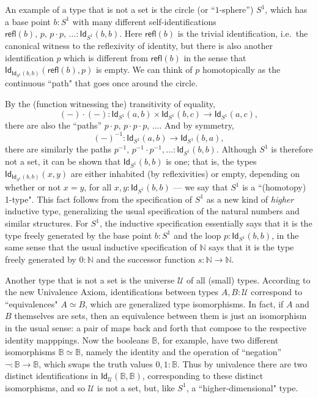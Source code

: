 \documentclass[11pt]{article}
\newcommand{\B}{\ensuremath{\mathbb{B}}}
\newcommand{\N}{\ensuremath{\mathbb{N}}}
\newcommand{\Id}{\mathsf{Id}}
\newcommand{\id}[1]{\Id_{#1}}
\newcommand{\refl}{\mathsf{refl}}
\newcommand{\U}{\ensuremath{\mathcal{U}}}
\theoremstyle{remark}
\theoremstyle{definition}
\begin{document}
 An example of a type that is not a set is the circle (or ``$1$-sphere'') $S^1$, which has a base point $b: S^1$ with many different self-identifications $\refl(b),\, p,\, p\cdot p,\, ... :\id{S^1}(b,b)$.  Here $\refl(b)$ is the trivial identification, i.e.\ the canonical witness to the reflexivity of identity, but there is also another identification $p$ which is different from $\refl(b)$ in the sense that $\id{\id{S^1}(b,b)}(\refl(b), p)$ is empty.  We can think of $p$ homotopically as the continuous ``path" that goes once around the circle. 

%
%
By the (function witnessing the) transitivity of equality, 
\[
(-)\cdot(-) : \id{S^1}(a,b) \times \id{S^1}(b,c)\to \id{S^1}(a,c),
\]
 there are also the ``paths'' $p\cdot p,\, p\cdot p\cdot p,\, \ldots$.   And by symmetry,
 \[
 (-)^{-1}:\id{S^1}(a,b) \to \id{S^1}(b,a),
 \]
 there are similarly the paths $p^{-1},\, p^{-1}\cdot p^{-1}, \ldots :\id{S^1}(b,b)$.  Although $S^1$ is therefore not a set, it can be shown that $\id{S^1}(b,b)$ is one; that is, the types $\id{\id{S^1}(b,b)}(x,y)$ are either inhabited (by reflexivities) or empty, depending on whether or not $x=y$, for all $x,y : \id{S^1}(b,b)$ --- we say that $S^1$ is a ``(homotopy) 1-type".  This fact follows from the specification of $S^1$ as a new kind of \emph{higher} inductive type, generalizing the usual specification of the natural numbers and similar structures.  For $S^1$, the inductive specification essentially says that it is the type freely generated by the base point $b:S^1$ and the loop $p:\id{S^1}(b,b)$, in the same sense that the usual inductive specification of $\N$ says that it is the type freely generated by $0:\N$ and the successor function $s:\N\to\N$.  
  
 Another type that is not a set is the universe $\U$ of all (small) types.  According to the new Univalence Axiom, identifications between types $A,B:\U$ correspond to ``equivalences" $A\simeq B$, which are generalized type isomorphisms.  In fact, if $A$ and $B$ themselves are sets, then an equivalence between them is just an isomorphism in the usual sense: a pair of maps back and forth that compose to the respective identity mapppings.  Now the booleans $\B$, for example, have two different isomorphisms $\B\simeq \B$, namely the identity and the operation of ``negation'' $\neg:\B\to\B$, which swaps the truth values $0,1:\B$.  Thus by univalence there are two distinct identifications in $\id{\U}(\B,\B)$, corresponding to these distinct isomorphisms, and so $\U$ is not a set, but, like $S^1$, a ``higher-dimensional" type.  
 
\end{document}
